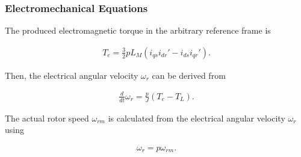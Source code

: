 \begin{flushleft}
\subsubsection{Electromechanical Equations}
The produced electromagnetic torque in the arbitrary reference frame is

\begin{align*}
T_e = \frac{3}{2}pL_M(i_{qs}i_{dr}'-i_{ds}i_{qr}').
\end{align*}

Then, the electrical angular velocity $\omega_r$ can be derived from 

\begin{align*}
\frac{d}{dt}\omega_r = \frac{p}{J}(T_e - T_L).
\end{align*}

The actual rotor speed $\omega_{rm}$ is calculated from the electrical angular velocity $\omega_r$ using

\begin{align*}
\omega_r = p\omega_{rm}.
\end{align*}


\end{flushleft}